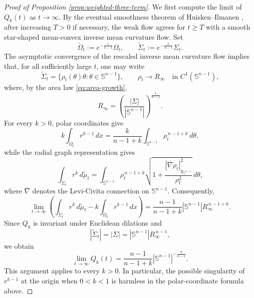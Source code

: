 \documentclass[11pt,reqno]{amsart}
\numberwithin{equation}{section}
\theoremstyle{definition}
\begin{document}
\begin{proof}[Proof of Proposition \ref{prop:weighted-three-term}]

We first compute the limit of $Q_k(t)$ as $t\to\infty$. By the eventual smoothness theorem of Huisken--Ilmanen \cite[Theorem~2.7]{HI2008}, after increasing $T>0$ if necessary, the weak flow agrees for $t\geq T$ with a smooth star-shaped mean-convex inverse mean curvature flow. Set
\begin{equation*}
    \widetilde\Omega_t:=e^{-\frac{t}{n-1}}\Omega_t,
    \qquad
    \widetilde\Sigma_t:=e^{-\frac{t}{n-1}}\Sigma_t .
\end{equation*}
The asymptotic convergence of the rescaled inverse mean curvature flow \cite{Gerhardt1990,Urbas1990} implies that, for all sufficiently large $t$, one may write
\begin{equation*}
    \widetilde\Sigma_t
    =\{\rho_t(\theta)\theta:\theta\in\mathbb S^{n-1}\},
    \qquad
    \rho_t\longrightarrow R_\infty
    \quad\text{in }C^1(\mathbb S^{n-1}),
\end{equation*}
where, by the area law \eqref{eq:area-growth},
\begin{equation*}
    R_\infty
    =\left(\frac{|\Sigma|}{|\mathbb S^{n-1}|}\right)^{\frac1{n-1}}.
\end{equation*}
For every $k>0$, polar coordinates give
\begin{equation*}
    k\int_{\widetilde\Omega_t}r^{k-1}\,dx
    =\frac{k}{n-1+k}
      \int_{\mathbb S^{n-1}}\rho_t^{\,n-1+k}\,d\theta,
\end{equation*}
while the radial graph representation gives
\begin{equation*}
    \int_{\widetilde\Sigma_t}r^k\,d\widetilde\mu_t
    =
    \int_{\mathbb S^{n-1}}
       \rho_t^{\,n-1+k}
       \sqrt{1+\frac{|\overline{\nabla}\rho_t|_{g_{\mathbb{S}^{n-1}}}^2}{\rho_t^2}}\,d\theta,
\end{equation*}
where $\overline{\nabla}$ denotes the Levi-Civita connection on $\mathbb{S}^{n-1}$. Consequently,
\begin{equation*}
    \lim_{t\to\infty}
    \left(
      \int_{\widetilde\Sigma_t}r^k\,d\widetilde\mu_t
      -k\int_{\widetilde\Omega_t}r^{k-1}\,dx
    \right)
    =
    \frac{n-1}{n-1+k}
    |\mathbb S^{n-1}|R_\infty^{\,n-1+k}.
\end{equation*}
Since $Q_k$ is invariant under Euclidean dilations and
\begin{equation*}
    |\widetilde\Sigma_t|
    =|\Sigma|
    =|\mathbb S^{n-1}|R_\infty^{\,n-1},
\end{equation*}
we obtain
\begin{equation}\label{eq:limit-Q}
    \lim_{t\to\infty}Q_k(t)
    =
    \frac{n-1}{n-1+k}
    |\mathbb S^{n-1}|^{-\frac{k}{n-1}}.
\end{equation}
This argument applies to every $k>0$. In particular, the possible singularity of $r^{k-1}$ at the origin when $0<k<1$ is harmless in the polar-coordinate formula above.


\end{proof}
\end{document}

